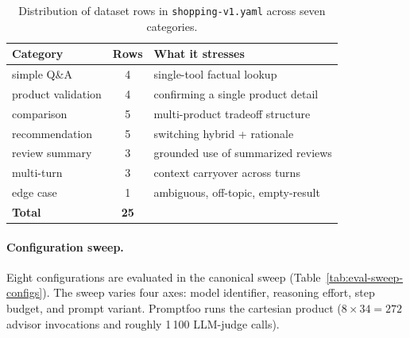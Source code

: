 \begin{table}[ht]
  \centering
  \footnotesize
  \begin{tabular}{|l|c|l|}
    \hline
    \textbf{Category} & \textbf{Rows} & \textbf{What it stresses} \\
    \hline
    simple Q\&A             & 4 & single-tool factual lookup \\
    product validation      & 4 & confirming a single product detail \\
    comparison              & 5 & multi-product tradeoff structure \\
    recommendation          & 5 & switching hybrid + rationale \\
    review summary          & 3 & grounded use of summarized reviews \\
    multi-turn              & 3 & context carryover across turns \\
    edge case               & 1 & ambiguous, off-topic, empty-result \\
    \hline
    \textbf{Total}          & \textbf{25} & \\
    \hline
  \end{tabular}
  \caption{Distribution of dataset rows in
  \texttt{shopping-v1.yaml} across seven categories.}
  \label{tab:eval-dataset-categories}
\end{table}

\paragraph{Configuration sweep.} Eight configurations are
evaluated in the canonical sweep
(Table~\ref{tab:eval-sweep-configs}). The sweep varies four axes:
model identifier, reasoning effort, step budget, and prompt
variant. Promptfoo runs the cartesian product
($8 \times 34 = 272$ advisor invocations and roughly
1\,100 LLM-judge calls).

